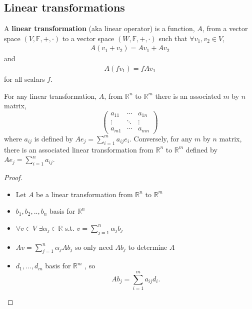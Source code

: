 \documentclass[compress]{beamer}
\def\F{\mathbb{F}}
\def\R{\mathbb{R}}
\newcommand{\gmatrix}[1]{\begin{pmatrix} {#1}_{11} & \cdots &
    {#1}_{1n} \\ \vdots & \ddots & \vdots \\ {#1}_{m1} & \cdots &
    {#1}_{mn} \end{pmatrix}}
\begin{document}
\subsection{Linear transformations}

\begin{frame}
  \begin{definition}
    A \textbf{linear transformation} (aka linear operator) is a
    function, $A$, from a vector space $(V,\F,+,\cdot)$ to a vector
    space $(W,\F,+,\cdot)$ such that $\forall v_1, v_2 \in V$,
    \begin{align*}
      A (v_1 + v_2) = A v_1 + A v_2 
    \end{align*}
    and 
    \begin{align*}
      A (f v_1) = f A v_1
    \end{align*}
    for all scalars $f$.   
  \end{definition}
\end{frame}

\begin{frame}
  \begin{theorem}
    For any linear transformation, $A$, from $\R^n$ to $\R^m$ there is an
    associated $m$ by $n$ matrix,
    \[ 
    \gmatrix{a}
    \]
    where $a_{ij}$ is defined by $A e_j = \sum_{i=1}^m a_{ij}
    e_i$. Conversely, for any $m$ by $n$ matrix, there is an associated
    linear transformation from $\R^n$ to $\R^m$ defined by $A e_j =
    \sum_{i=1}^n a_{ij}$.
  \end{theorem}
\end{frame}

\begin{frame}
  \begin{proof}
    \begin{itemize} 
    \item Let $A$ be a linear transformation from $\R^n$ to
      $\R^m$
    \item $b_1, b_2, .., b_n$ basis for $\R^n$
    \item $\forall v \in V$ $\exists \alpha_j\in \R$ s.t. $v = \sum_{j=1}^n
      \alpha_j b_j$ 
    \item $A v = \sum_{j=1}^n \alpha_j A b_j$ so only need $A b_j$ to
      determine $A$
    \item $d_1, ..., d_m $ basis for $\R^m$ , so 
      \[
      A b_j = \sum_{i=1}^m a_{ij} d_i.
      \]
    \end{itemize}
  \end{proof}
\end{frame}
\end{document}
